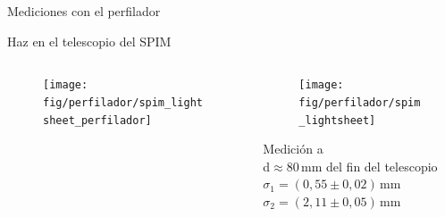 \begin{frame}{Mediciones con el perfilador}
\begin{onlyenv}
        Haz en el telescopio del SPIM
        \begin{columns}[c]
        \begin{column}{0.5\textwidth}
            \begin{figure}[H]
                \centering
                \texttt{[image: fig/perfilador/spim\_lightsheet\_perfilador]}
                \label{fig:spim_lightsheet_perfilador}
            \end{figure}
        \end{column}
        \begin{column}{0.5\textwidth}
            \vspace{-3em}
            \begin{figure}[H]
                \centering
                \texttt{[image: fig/perfilador/spim\_lightsheet]}
                \label{fig:spim_lightsheet}
            \end{figure}
            \vspace{-1em}
            Medición a \\d$\approx$80$\,$mm del fin del telescopio
            $\sigma_1 = (0,55 \pm 0,02)\,\text{mm}$\\
            $\sigma_2 = (2,11 \pm 0,05)\,\text{mm}$\\
            \end{column}
        \end{columns}
        \vspace{1em}
    \end{onlyenv}
\end{frame}


